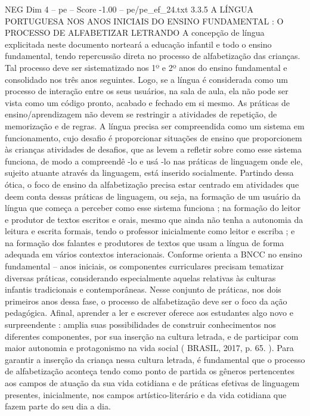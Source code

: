 \begin{textsample}{NEG Dim 4 – pe – Score -1.00 – pe/pe\_ef\_24.txt}  \label{ex:f4_neg_014}
3.3.5 A LÍNGUA PORTUGUESA NOS ANOS INICIAIS DO ENSINO FUNDAMENTAL : O PROCESSO DE ALFABETIZAR LETRANDO A concepção de língua explicitada neste documento norteará a educação infantil e todo o ensino fundamental, tendo repercussão direta no processo de alfabetização das crianças.
Tal processo deve ser sistematizado nos 1º e 2º anos do ensino fundamental e consolidado nos três anos seguintes.
Logo, se a língua é considerada como um processo de interação entre os seus usuários, na sala de aula, ela não pode ser vista como um código pronto, acabado e fechado em si mesmo.
As práticas de ensino/aprendizagem não devem se restringir a atividades de repetição, de memorização e de regras.
A língua precisa ser compreendida como um sistema em funcionamento, cujo desafio é proporcionar situações de ensino que proporcionem às crianças atividades de desafios, que as levem a refletir sobre como esse sistema funciona, de modo a compreendê -lo e usá -lo nas práticas de linguagem onde ele, sujeito atuante através da linguagem, está inserido socialmente.
Partindo dessa ótica, o foco de ensino da alfabetização precisa estar centrado em atividades que deem conta dessas práticas de linguagem, ou seja, na formação de um usuário da língua que começa a perceber como esse sistema funciona ; na formação do leitor e produtor de textos escritos e orais, mesmo que ainda não tenha a autonomia da leitura e escrita formais, tendo o professor inicialmente como leitor e escriba ; e na formação dos falantes e produtores de textos que usam a língua de forma adequada em vários contextos interacionais.
Conforme orienta a BNCC no ensino fundamental – anos iniciais, os componentes curriculares precisam tematizar diversas práticas, considerando especialmente aquelas relativas às culturas infantis tradicionais e contemporâneas.
Nesse conjunto de práticas, nos dois primeiros anos dessa fase, o processo de alfabetização deve ser o foco da ação pedagógica.
Afinal, aprender a ler e escrever oferece aos estudantes algo novo e surpreendente : amplia suas possibilidades de construir conhecimentos nos diferentes componentes, por sua inserção na cultura letrada, e de participar com maior autonomia e protagonismo na vida social ( BRASIL, 2017, p. 65. ).
Para garantir a inserção da criança nessa cultura letrada, é fundamental que o processo de alfabetização aconteça tendo como ponto de partida os gêneros pertencentes aos campos de atuação da sua vida cotidiana e de práticas efetivas de linguagem presentes, inicialmente, nos campos artístico-literário e da vida cotidiana que fazem parte do seu dia a dia.

\end{textsample}
